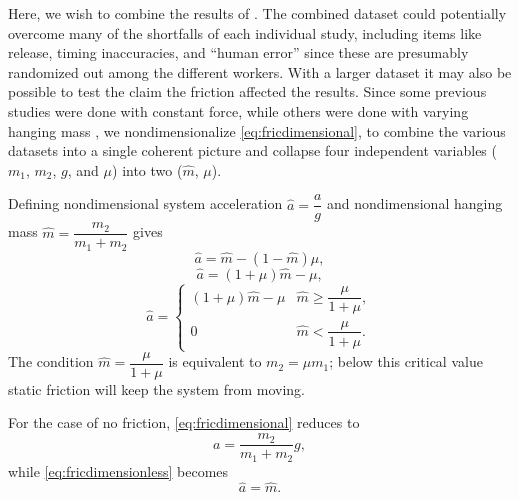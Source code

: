 \documentclass[reprint,amsmath,amssymb,aps,twoside]{revtex4-2}
\begin{document}
Here, we wish to combine the results of \cite{arenas-2024-testing,avalur-2024-verifying,canada-2024-experimental,kishore-2024-relationship,yagnyeshwaran-2024-verifying,govardhanen-2024-newtons,kedharnath-2024-examining,krasnopolsky-2024-testing,perle-2024-experimental}. The combined dataset could potentially overcome many of the shortfalls of each individual study, including items like release, timing inaccuracies, and ``human error'' since these are presumably randomized out among the different workers. With a larger dataset it may also be possible to test the claim the friction affected the results.  Since some previous studies \cite{arenas-2024-testing,avalur-2024-verifying,canada-2024-experimental,kishore-2024-relationship,yagnyeshwaran-2024-verifying} were done with constant force, while others were done with varying hanging mass \cite{govardhanen-2024-newtons,kedharnath-2024-examining,krasnopolsky-2024-testing}, we nondimensionalize \cref{eq:fricdimensional}, to combine the various datasets into a single coherent picture and collapse four independent variables ($m_1$, $m_2$, $g$, and $\mu$) into two ($\hat{m}$, $\mu$). 

Defining nondimensional system acceleration $\hat{a} = \dfrac{a}{g}$ and nondimensional hanging mass $\hat{m} = \dfrac{m_2}{m_1+m_2}$ gives
\begin{equation}
\hat{a} = \hat{m} - (1-\hat{m}) \mu,
\end{equation}
\begin{equation}
\hat{a} = (1+\mu) \hat{m} - \mu,
\end{equation}
\begin{equation}
\hat{a} = 
\begin{cases}
(1+\mu) \hat{m} - \mu & \hat{m} \geq \dfrac{\mu}{1+\mu}, \\
0 & \hat{m} < \dfrac{\mu}{1+\mu}.
\end{cases}
\label{eq:fricdimensionless}
\end{equation}
The condition $\hat{m}=\dfrac{\mu}{1+\mu}$ is equivalent to $m_2=\mu m_1$; below this critical value static friction will keep the system from moving. 

For the case of no friction, \cref{eq:fricdimensional} reduces to
\begin{equation}
a = \dfrac{m_2}{m_1+m_2} g,
\label{eq:nofricdimensional}
\end{equation}
while \cref{eq:fricdimensionless} becomes
\begin{equation}
\hat{a} = \hat{m}.
\label{eq:nofricdimensionless}
\end{equation}
\end{document}
